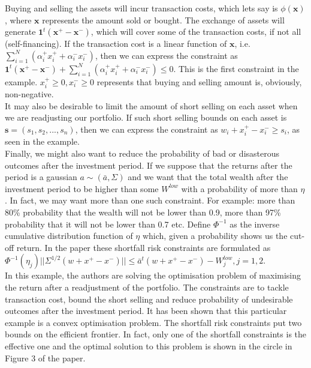 \documentclass[11pt]{article}
\begin{document}
Buying and selling the assets will incur transaction costs, which lets say is $\phi(\bm{x})$, where $\bm{x}$ represents the amount sold or 
bought. The exchange of assets will generate $\bm{1}^t(\bm{x^+} - \bm{x^-})$, which will cover some of the transaction costs, if not all 
(self-financing). If the transaction cost is a linear function of $\bm{x}$, i.e. $\sum_{i=1}^N(\alpha_i^+x_i^+ + \alpha_i^-x_i^-)$, then we
can express the constraint as $\bm{1}^t(\bm{x^+} - \bm{x^-}) + \sum_{i=1}^N(\alpha_i^+x_i^+ + \alpha_i^-x_i^-) \leq 0$. This is the first
constraint in the example. $x_i^+ \geq 0, x_i^- \geq 0$ represents that buying and selling amount is, obviously, non-negative.\\

It may also be desirable to limit the amount of short selling on each asset when we are readjusting our portfolio. If such short selling bounds
on each asset is $\bm{s} = (s_1, s_2, ..., s_n)$, then we can express the constraint as $w_i + x_i^+ - x_i^- \geq s_i$, as seen in the example.\\

Finally, we might also want to reduce the probability of bad or disasterous outcomes after the investment period. If we suppose that the returns
after the period is a gaussian $a \sim (\bar{a}, \Sigma)$ and we want that the total wealth after the investment period to be higher
than some $W^{low}$ with a probability of more than $\eta$. In fact, we may want more than one such constraint. For example: more than 80\% probability
that the wealth will not be lower than 0.9, more than 97\% probability that it will not be lower than 0.7 etc. Define $\Phi^{-1}$ as the inverse cumulative distribution function of $\eta$ which, given a probability shows us the cut-off return. In the paper these shortfall risk constraints are formulated as $\Phi^{-1}(\eta_j)||\Sigma^{1/2}(w + x^+ - x^-)|| \leq \bar{a}^t(w + x^+ - x^-) - W^{low}_j, j=1,2$.\\

In this example, the authors are solving the optimisation problem of maximising the return after a readjustment of the portfolio. The constraints
are to tackle transaction cost, bound the short selling and reduce probability of undesirable outcomes after the investment period. It has been shown
that this particular example is a convex optimisation problem. The shortfall risk constraints put two bounds on the efficient frontier. In fact, only
one of the shortfall constraints is the effective one and the optimal solution to this problem is shown in the circle in Figure 3 of the paper.
\end{document}
